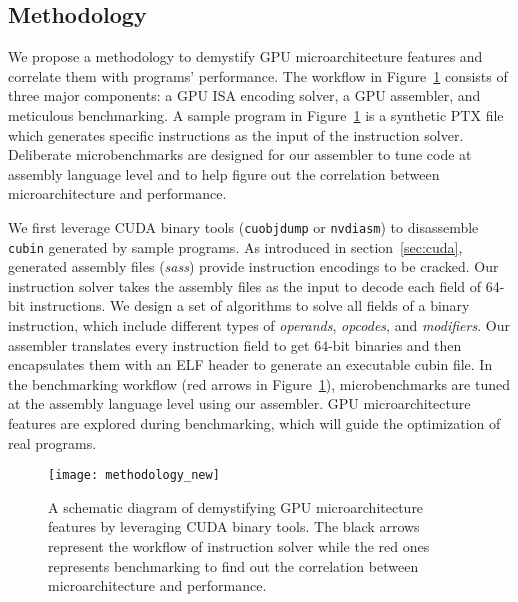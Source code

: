 \subsection{Methodology}


We propose a methodology to demystify GPU microarchitecture features and correlate them with programs' performance.
The workflow in Figure~\ref{fig:workflow} consists of three major components: a GPU ISA encoding solver, a GPU assembler, and meticulous benchmarking.
A sample program in Figure~\ref{fig:workflow} is a synthetic PTX file which generates specific instructions as the input of the instruction solver.
Deliberate microbenchmarks are designed for our assembler to tune code at assembly language level and to help figure out the correlation between microarchitecture and performance.

We first leverage CUDA binary tools ({\tt cuobjdump} or {\tt nvdiasm}) to disassemble {\tt cubin} generated by sample programs. %
As introduced in section~\ref{sec:cuda}, generated assembly files ({\em sass}) provide instruction encodings to be cracked.
Our instruction solver takes the assembly files as the input to decode each field of 64-bit instructions.
We design a set of algorithms to solve all fields of a binary instruction, which include different types of {\em operands}, {\em opcodes}, and {\em modifiers}.
Our assembler translates every instruction field to get $64$-bit binaries and then encapsulates them with an ELF header to generate an executable cubin file.
In the benchmarking workflow (red arrows in Figure~\ref{fig:workflow}), microbenchmarks are tuned at the assembly language level using our assembler.
GPU microarchitecture features are explored during benchmarking, which will guide the optimization of real programs.


\begin{figure}[htbp]
\begin{center}
    \texttt{[image: methodology\_new]}
\caption{A schematic diagram of demystifying GPU microarchitecture features by leveraging CUDA binary tools. The black arrows
    represent the workflow of instruction solver while the red ones represents benchmarking to find out the correlation between microarchitecture and performance.}
\label{fig:workflow}
\end{center}
\end{figure}
